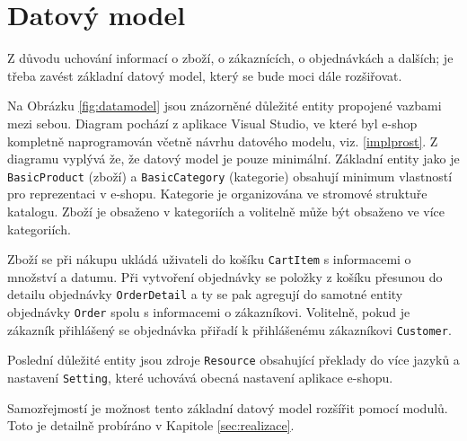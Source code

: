 \documentclass[11pt,twoside,a4paper]{book}
\begin{document}
\section{Datový model}

Z důvodu uchování informací o zboží, o zákaznících, o objednávkách a dalších; je třeba zavést základní datový model, který se bude moci dále rozšiřovat.

Na Obrázku \ref{fig:datamodel} jsou znázorněné důležité entity propojené vazbami mezi sebou. Diagram pochází z aplikace Visual Studio, ve které byl e-shop kompletně naprogramován včetně návrhu datového modelu, viz. \ref{implprost}. Z diagramu vyplývá že, že datový model je pouze minimální. Základní entity jako je  \texttt{BasicProduct} (zboží) a \texttt{BasicCategory} (kategorie) obsahují minimum vlastností pro reprezentaci v e-shopu. Kategorie je organizována ve stromové struktuře katalogu. Zboží je obsaženo v kategoriích a volitelně může být obsaženo ve více kategoriích.
	
Zboží se při nákupu ukládá uživateli do košíku \texttt{CartItem} s informacemi o množství a datumu. Při vytvoření objednávky se položky z košíku přesunou do detailu objednávky \texttt{OrderDetail} a ty se pak agregují do samotné entity objednávky \texttt{Order} spolu s informacemi o zákazníkovi. Volitelně, pokud je zákazník přihlášený se objednávka přiřadí k přihlášenému zákazníkovi \texttt{Customer}. 
	
Poslední důležité entity jsou zdroje \texttt{Resource} obsahující překlady do více jazyků a nastavení \texttt{Setting}, které uchovává obecná nastavení aplikace e-shopu.

	Samozřejmostí je možnost tento základní datový model rozšířit pomocí modulů. Toto je detailně probíráno v Kapitole \ref{sec:realizace}.
	
\end{document}
